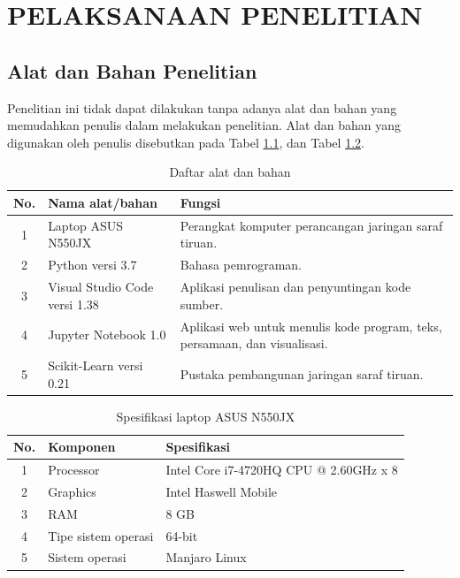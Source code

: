 \chapter{PELAKSANAAN PENELITIAN}
\label{pelaksanaan-penelitian}

\section{Alat dan Bahan Penelitian}
Penelitian ini tidak dapat dilakukan tanpa adanya alat dan bahan yang memudahkan penulis dalam melakukan penelitian. Alat dan bahan yang digunakan oleh penulis disebutkan pada Tabel \ref{tbl:4:alatbahan}, dan Tabel \ref{tbl:4:speklaptop}.

\vspace{2em}
\begin{table}[!h]
	\caption{Daftar alat dan bahan}
	\label{tbl:4:alatbahan}
	\centering
	\begin{tabular}{|c|p{5cm}|p{8cm}|}
		\hline
		No. & Nama alat/bahan & Fungsi \\
		\hline
		1 & Laptop ASUS N550JX & Perangkat komputer perancangan jaringan saraf tiruan. \\
		\hline
		2 & Python versi 3.7 & Bahasa pemrograman. \\
		\hline
		3 & Visual Studio Code versi 1.38 & Aplikasi penulisan dan penyuntingan kode sumber. \\
		\hline
		4 & Jupyter Notebook 1.0 & Aplikasi web untuk menulis kode program, teks, persamaan, dan visualisasi. \\
		\hline
		5 & Scikit-Learn versi 0.21 & Pustaka pembangunan jaringan saraf tiruan. \\
		\hline
	\end{tabular}
\end{table}

\vspace{2em}
\begin{table}[!h]
	\caption{Spesifikasi laptop ASUS N550JX}
	\label{tbl:4:speklaptop}
	\centering
	\begin{tabular}{|c|p{5cm}|p{8cm}|}
		\hline
		No. & Komponen & Spesifikasi \\ 
		\hline
		1 & Processor & Intel Core i7-4720HQ CPU @ 2.60GHz x 8 \\ 
		\hline
		2 & Graphics & Intel Haswell Mobile \\
		\hline
		3 & RAM & 8 GB \\ 
		\hline
		4 & Tipe sistem operasi & 64-bit \\
		\hline
		5 & Sistem operasi & Manjaro Linux \\ 
		\hline
	\end{tabular}
\end{table}


